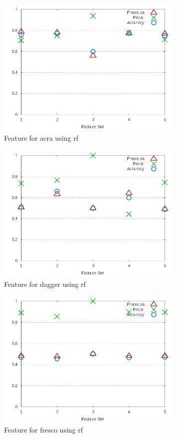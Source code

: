 \begin{figure}[!t]
    \centering
        \includegraphics[width=0.8\textwidth]{images/rf/test_3/acra_sample_range}
        \caption{Feature for acra using \gls{rf}}
        \label{fig:test_3_acra_rf}
\end{figure}

\begin{figure}[!ht]
    \centering
        \includegraphics[width=0.8\textwidth]{images/rf/test_3/dagger_sample_range}
        \caption{Feature for dagger using \gls{rf}}
        \label{fig:test_3_dagger_rf}
\end{figure}

\begin{figure}[!ht]
    \centering
        \includegraphics[width=0.8\textwidth]{images/rf/test_3/fresco_sample_range}
        \caption{Feature for fresco using \gls{rf}}
        \label{fig:test_3_fresco_rf}
\end{figure}

